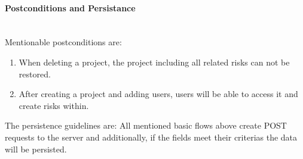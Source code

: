 \paragraph*{Postconditions and Persistance}\mbox{}\\
Mentionable postconditions are:
\begin{enumerate}
	\vspace{-3mm}
	\setlength\itemsep{-1em}
	\item When deleting a project, the project including all related risks can not be restored.
	\item After creating a project and adding users, users will be able to access it and create risks within.
\end{enumerate}

\noindent
The persistence guidelines are: 
\newline
\noindent
All mentioned basic flows above create POST requests to the server and additionally, if the fields meet their criterias the data will be persisted.